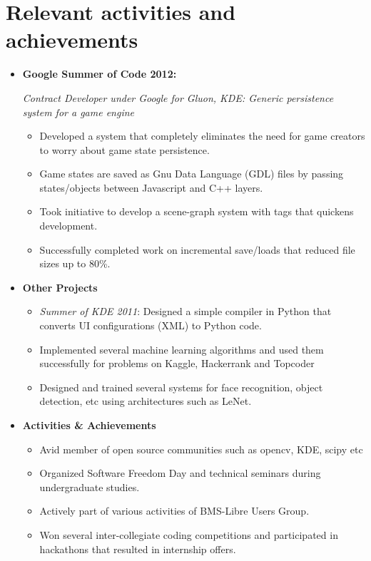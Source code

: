 \documentclass[10pt,letterpaper,sans]{moderncv}        %
\begin{document}
\section{Relevant activities and achievements}
\begin{itemize}
\item \textbf{Google Summer of Code 2012:}
\small{
\textit{Contract Developer under Google for Gluon, KDE: Generic persistence system for a game engine}
\begin{itemize}
\item Developed a system that completely eliminates the need for game creators to worry about game state persistence.
\item Game states are saved as Gnu Data Language (GDL) files by passing states/objects between Javascript and C++ layers.
\item Took initiative to develop a scene-graph system with tags that quickens development. 
\item Successfully completed work on incremental save/loads that reduced file sizes up to 80\%.
\end{itemize}
}
\item \textbf{Other Projects}
\begin{small}
\begin{itemize}
\item \textit{Summer of KDE 2011}: Designed a simple compiler in Python that converts UI configurations (XML) to Python code.
\item Implemented several machine learning algorithms and used them successfully for problems on Kaggle, Hackerrank and Topcoder
\item Designed and trained several systems for face recognition, object detection, etc using architectures such as LeNet.
\end{itemize}
\end{small}
\item \textbf{Activities \& Achievements}
\begin{small}
\begin{itemize}
\item Avid member of open source communities such as opencv, KDE, scipy etc
\item Organized Software Freedom Day and technical seminars during undergraduate studies. 
\item Actively part of various activities of BMS-Libre Users Group.
\item Won several inter-collegiate coding competitions and participated in hackathons that resulted in internship offers.
\end{itemize}
\end{small}
\end{itemize}
\end{document}
